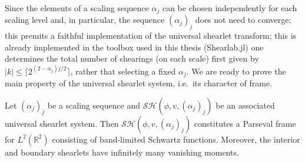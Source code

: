 \bigskip

Since the elements of a scaling sequence $\alpha_j$ can be chosen independently for each scaling level and, in particular, the sequence $(\alpha_j)_j$ does not need to converge; this premits a faithful implementation of the universal shearlet transform; this is already implemented in the toolbox used in this thesis (Shearlab.jl) one determines the total number of shearings (on each scale) first given by $|k|\leq \lceil 2^{(2-\alpha_j)j/2}\rceil$, rather that selecting a fixed $\alpha_j$. We are ready to prove the main property of the universal shearlet system, i.e.\ its character of frame.

\begin{thm}
\label{thm:alpha34}
Let $(\alpha_j)_{j}$ be a scaling sequence and $\mathcal{SH}(\phi,v,(\alpha_j)_j)$ be an associated universal shearlet system. Then $\mathcal{SH}(\phi,v,(\alpha_j)_j)$ constitutes a Parseval frame for $L^2(\mathbb{R}^2)$ consisting of band-limited Schwartz functions. Moreover, the interior and boundary shearlets have infinitely  many vanishing moments. 
\end{thm}

